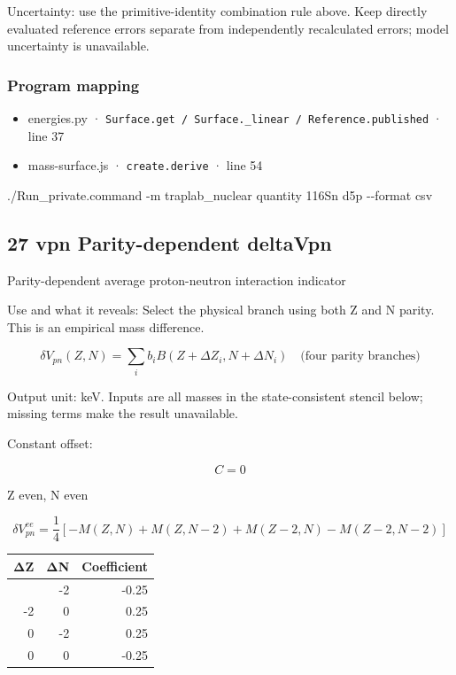 \documentclass[
  11pt,
  letterpaper,
]{article}
\newenvironment{Shaded}{}{}
\newcommand{\AttributeTok}[1]{\textcolor[rgb]{0.49,0.56,0.16}{#1}}
\newcommand{\ExtensionTok}[1]{#1}
\newcommand{\NormalTok}[1]{#1}
\providecommand{\tightlist}{%
  \setlength{\itemsep}{0pt}\setlength{\parskip}{0pt}}
\begin{document}
Uncertainty: use the primitive-identity combination rule above. Keep
directly evaluated reference errors separate from independently
recalculated errors; model uncertainty is unavailable.

\subsubsection{Program mapping}\label{program-mapping-25}

\begin{itemize}
\tightlist
\item
  energies.py ·
  \texttt{Surface.get\ /\ Surface.\_linear\ /\ Reference.published} ·
  line 37
\item
  mass-surface.js · \texttt{create.derive} · line 54
\end{itemize}

\begin{Shaded}
\begin{Highlighting}[]
\ExtensionTok{./Run\_private.command} \AttributeTok{{-}m}\NormalTok{ traplab\_nuclear quantity 116Sn d5p }\AttributeTok{{-}{-}format}\NormalTok{ csv}
\end{Highlighting}
\end{Shaded}

\subsection{27 vpn Parity-dependent
deltaVpn}\label{vpn-parity-dependent-deltavpn}

Parity-dependent average proton-neutron interaction indicator

Use and what it reveals: Select the physical branch using both Z and N
parity. This is an empirical mass difference.

\[
\delta V_{pn}(Z,N)=\sum_i b_i B(Z+\Delta Z_i,N+\Delta N_i)\quad\text{(four parity branches)}
\]

Output unit: keV. Inputs are all masses in the state-consistent stencil
below; missing terms make the result unavailable.

Constant offset:

\[
C=0
\]

Z even, N even

\[
\delta V_{pn}^{ee}=\frac14[-M(Z,N)+M(Z,N-2)+M(Z-2,N)-M(Z-2,N-2)]
\]

\begin{longtable}[]{@{}rrr@{}}
\toprule\noalign{}
ΔZ & ΔN & Coefficient \\
\midrule\noalign{}
\endhead
\bottomrule\noalign{}
\endlastfoot
-2 & -2 & -0.25 \\
-2 & 0 & 0.25 \\
0 & -2 & 0.25 \\
0 & 0 & -0.25 \\
\end{longtable}
\end{document}
